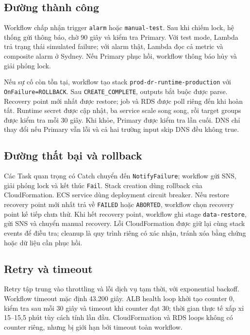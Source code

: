 \subsection{Đường thành công}

Workflow chấp nhận trigger \texttt{alarm} hoặc \texttt{manual-test}. Sau khi chiếm lock, hệ thống gửi thông báo, chờ 90 giây và kiểm tra Primary. Với test mode, Lambda trả trạng thái simulated failure; với alarm thật, Lambda đọc cả metric và composite alarm ở Sydney. Nếu Primary phục hồi, workflow thông báo hủy và giải phóng lock.

Nếu sự cố còn tồn tại, workflow tạo stack \texttt{prod-dr-runtime-production} với \texttt{OnFailure=ROLLBACK}. Sau \texttt{CREATE\_COMPLETE}, outputs bắt buộc được parse. Recovery point mới nhất được restore; job và RDS được poll riêng đến khi hoàn tất. Runtime secret được cập nhật, ba service scale song song, rồi target groups được kiểm tra mỗi 30 giây. Khi khỏe, Primary được kiểm tra lần cuối. DNS chỉ thay đổi nếu Primary vẫn lỗi và cả hai trường input skip DNS đều không true.

\subsection{Đường thất bại và rollback}

Các Task quan trọng có Catch chuyển đến \texttt{NotifyFailure}; workflow gửi SNS, giải phóng lock và kết thúc \texttt{Fail}. Stack creation dùng rollback của CloudFormation. ECS service dùng deployment circuit breaker. Nếu restore recovery point mới nhất trả về \texttt{FAILED} hoặc \texttt{ABORTED}, workflow chọn recovery point kế tiếp chưa thử. Khi hết recovery point, workflow ghi stage \texttt{data-restore}, gửi SNS và chuyển manual recovery. Lỗi CloudFormation được giữ lại cùng stack events để điều tra; cleanup là quy trình riêng có xác nhận, tránh xóa bằng chứng hoặc dữ liệu cần phục hồi.

\subsection{Retry và timeout}

Retry tập trung vào throttling và lỗi dịch vụ tạm thời, với exponential backoff. Workflow timeout mặc định 43.200 giây. ALB health loop khởi tạo counter 0, kiểm tra sau mỗi 30 giây và timeout khi counter đạt 30; thời gian thực tế xấp xỉ 15--15,5 phút tùy cách tính lần đầu. CloudFormation và RDS loops không có counter riêng, nhưng bị giới hạn bởi timeout toàn workflow.

